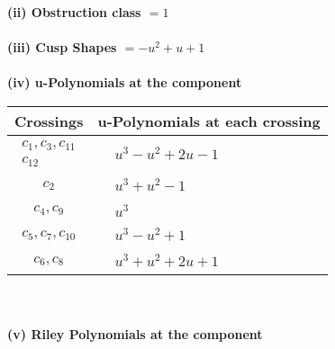 \documentclass[1p]{elsarticle_modified}
\theoremstyle{definition}
\begin{document}
\flushleft \textbf{(ii) Obstruction class $= 1$}\\~\\
\flushleft \textbf{(iii) Cusp Shapes $= - u^2+u+1$}\\~\\
\newpage\renewcommand{\arraystretch}{1}
\flushleft \textbf{(iv) u-Polynomials at the component}\newline \\
\begin{tabular}{m{50pt}|m{274pt}}
Crossings & \hspace{64pt}u-Polynomials at each crossing \\
\hline $$\begin{aligned}c_{1},c_{3},c_{11}\\c_{12}\end{aligned}$$&$\begin{aligned}
&u^3- u^2+2 u-1
\end{aligned}$\\
\hline $$\begin{aligned}c_{2}\end{aligned}$$&$\begin{aligned}
&u^3+u^2-1
\end{aligned}$\\
\hline $$\begin{aligned}c_{4},c_{9}\end{aligned}$$&$\begin{aligned}
&u^3
\end{aligned}$\\
\hline $$\begin{aligned}c_{5},c_{7},c_{10}\end{aligned}$$&$\begin{aligned}
&u^3- u^2+1
\end{aligned}$\\
\hline $$\begin{aligned}c_{6},c_{8}\end{aligned}$$&$\begin{aligned}
&u^3+u^2+2 u+1
\end{aligned}$\\
\hline
\end{tabular}\\~\\
\newpage\renewcommand{\arraystretch}{1}
\flushleft \textbf{(v) Riley Polynomials at the component}\newline \\
\end{document}
